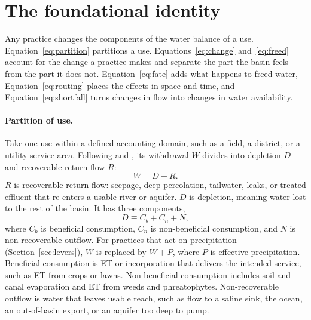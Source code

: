 \documentclass[11pt]{article}
\newcommand{\Cb}{C_b}                       %
\newcommand{\Cn}{C_n}                       %
\begin{document}
\section{The foundational identity}\label{sec:identity}

Any practice changes the components of the water balance of a use. Equation~\eqref{eq:partition} partitions a use. Equations~\eqref{eq:change} and~\eqref{eq:freed} account for the change a practice makes and separate the part the basin feels from the part it does not. Equation~\eqref{eq:fate} adds what happens to freed water, Equation~\eqref{eq:routing} places the effects in space and time, and Equation~\eqref{eq:shortfall} turns changes in flow into changes in water availability.

\paragraph{Partition of use.} Take one use within a defined accounting domain, such as a field, a district, or a utility service area. Following \citet{perry2007} and \citet{molden1997}, its withdrawal $W$ divides into depletion $D$ and recoverable return flow $R$:
\begin{equation}\label{eq:partition}
  W = D + R .
\end{equation}
$R$ is recoverable return flow: seepage, deep percolation, tailwater, leaks, or treated effluent that re-enters a usable river or aquifer. $D$ is depletion, meaning water lost to the rest of the basin. It has three components,
\[
  D \equiv \Cb + \Cn + N ,
\]
where $\Cb$ is beneficial consumption, $\Cn$ is non-beneficial consumption, and $N$ is non-recoverable outflow. For practices that act on precipitation (Section~\ref{sec:levers}), $W$ is replaced by $W + P$, where $P$ is effective precipitation. Beneficial consumption is ET or incorporation that delivers the intended service, such as ET from crops or lawns. Non-beneficial consumption includes soil and canal evaporation and ET from weeds and phreatophytes. Non-recoverable outflow is water that leaves usable reach, such as flow to a saline sink, the ocean, an out-of-basin export, or an aquifer too deep to pump.
\end{document}
